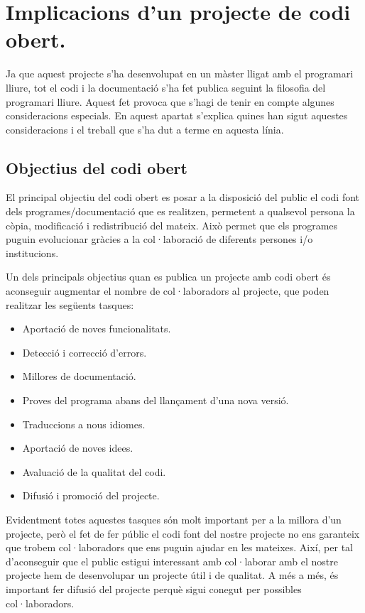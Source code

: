 \chapter{Implicacions d'un projecte de codi obert.}
\label{chap:codi_obert}

Ja que aquest projecte s'ha desenvolupat en un màster lligat amb el programari lliure, tot el codi i la documentació s'ha fet publica seguint la filosofia del programari lliure. Aquest fet provoca que s'hagi de tenir en compte algunes consideracions especials. En aquest apartat s'explica quines han sigut aquestes consideracions i el treball que s'ha dut a terme en aquesta línia. 

\section{Objectius del codi obert}

El principal objectiu del codi obert es posar a la disposició del public el codi font dels programes/documentació que es realitzen, permetent a qualsevol persona la còpia, modificació i redistribució del mateix. Això permet que els programes puguin evolucionar gràcies a la col·laboració de diferents persones i/o institucions.

Un dels principals objectius quan es publica un projecte amb codi obert és aconseguir augmentar el nombre de col·laboradors al projecte, que poden realitzar les següents tasques:

\begin{itemize}
\item{Aportació de noves funcionalitats.}
\item{Detecció i correcció d'errors.}
\item{Millores de documentació.}
\item{Proves del programa abans del llançament d'una nova versió.}
\item{Traduccions a nous idiomes.}
\item{Aportació de noves idees.}
\item{Avaluació de la qualitat del codi.}
\item{Difusió i promoció del projecte.}
\end{itemize}

Evidentment totes aquestes tasques són molt important per a la millora d'un projecte, però el fet de fer públic el codi font del nostre projecte no ens garanteix que trobem col·laboradors que ens puguin ajudar en les mateixes. Així, per tal d'aconseguir que el public estigui interessant amb col·laborar amb el nostre projecte hem de desenvolupar un projecte útil i de qualitat. A més a més, és important fer difusió del projecte perquè sigui conegut per possibles col·laboradors.  

